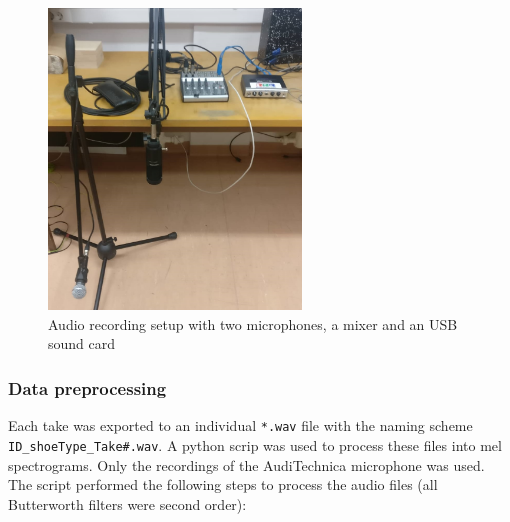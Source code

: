 \documentclass{article}
\begin{document}
\begin{figure}[ht]
  \centering
  \includegraphics[width=0.6\textwidth]{img/recording_setup}
  \caption{Audio recording setup with two microphones, a mixer and an USB sound card}
  \label{fig:rec_setup}
\end{figure}

\subsubsection{Data preprocessing}
Each take was exported to an individual \verb+*.wav+ file with the naming scheme \verb+ID_shoeType_Take#.wav+. A python scrip was used to process these files into mel spectrograms. Only the recordings of the AudiTechnica microphone was used. The script performed the following steps to process the audio files (all Butterworth filters were second order):
\end{document}
